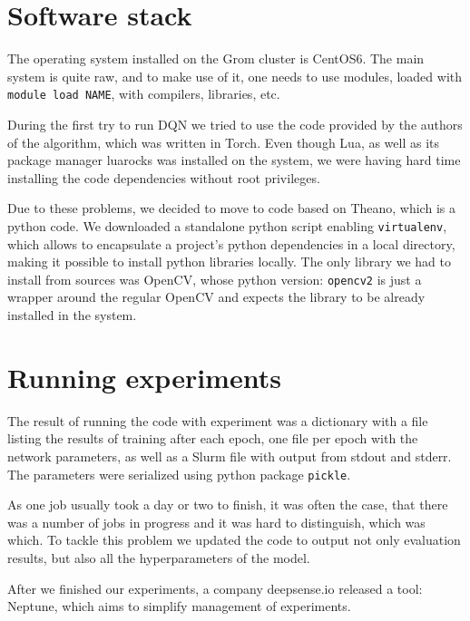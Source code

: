 \begin{appendices}
\section{Software stack}
  The operating system installed on the Grom cluster is CentOS6. The main system is quite raw, and to make use of it, one needs to use modules, loaded with \texttt{module load NAME}, with compilers, libraries, etc.

  During the first try to run DQN we tried to use the code provided by the authors of the algorithm, which was written in Torch. Even though Lua, as well as its package manager luarocks was installed on the system, we were having hard time installing the code dependencies without root privileges.

  Due to these problems, we decided to move to code based on Theano, which is a python code. We downloaded a standalone python script enabling \texttt{virtualenv}, which allows to encapsulate a project's python dependencies in a local directory, making it possible to install python libraries locally. The only library we had to install from sources was OpenCV, whose python version: \texttt{opencv2} is just a wrapper around the regular OpenCV and expects the library to be already installed in the system.

\section{Running experiments}
  The result of running the code with experiment was a dictionary with a file listing the results of training after each epoch, one file per epoch with the network parameters, as well as a Slurm file with output from stdout and stderr. The parameters were serialized using python package \texttt{pickle}.

  As one job usually took a day or two to finish, it was often the case, that there was a number of jobs in progress and it was hard to distinguish, which was which. To tackle this problem we updated the code to output not only evaluation results, but also all the hyperparameters of the model.

  After we finished our experiments, a company deepsense.io released a tool: Neptune, which aims to simplify management of experiments.


\end{appendices}
